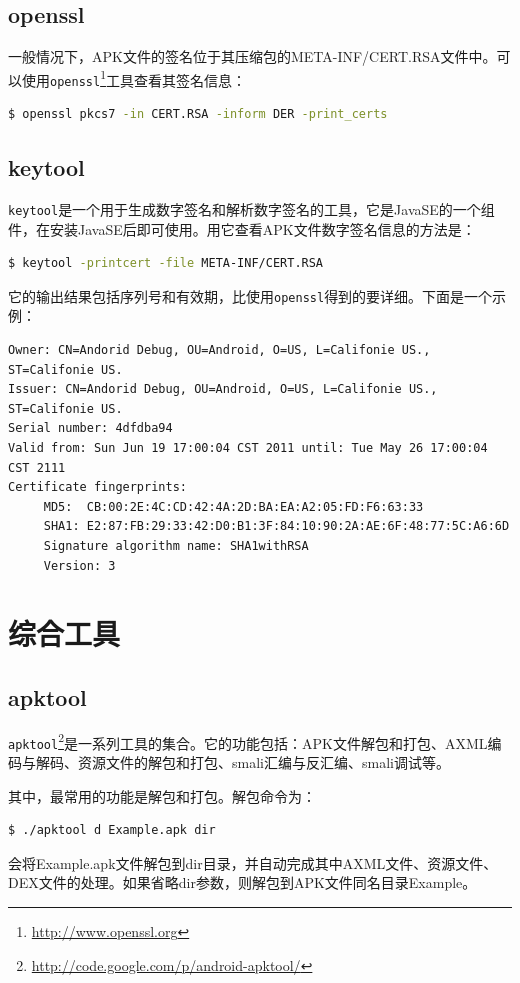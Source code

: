 \subsection{openssl}
一般情况下，APK文件的签名位于其压缩包的META-INF/CERT.RSA文件中。可以使用\lstinline!openssl!\footnote{\url{http://www.openssl.org}}工具查看其签名信息：
\begin{lstlisting}[language=bash, numbers=none]
 $ openssl pkcs7 -in CERT.RSA -inform DER -print_certs
\end{lstlisting}

\subsection{keytool}
\lstinline!keytool!是一个用于生成数字签名和解析数字签名的工具，它是JavaSE的一个组件，在安装JavaSE后即可使用。用它查看APK文件数字签名信息的方法是：
\begin{lstlisting}[language=bash, numbers=none]
 $ keytool -printcert -file META-INF/CERT.RSA
\end{lstlisting}
它的输出结果包括序列号和有效期，比使用\lstinline!openssl!得到的要详细。下面是一个示例：

\begin{lstlisting}[language={}, numbers=none]
Owner: CN=Andorid Debug, OU=Android, O=US, L=Califonie US., ST=Califonie US.
Issuer: CN=Andorid Debug, OU=Android, O=US, L=Califonie US., ST=Califonie US.
Serial number: 4dfdba94
Valid from: Sun Jun 19 17:00:04 CST 2011 until: Tue May 26 17:00:04 CST 2111
Certificate fingerprints:
	 MD5:  CB:00:2E:4C:CD:42:4A:2D:BA:EA:A2:05:FD:F6:63:33
	 SHA1: E2:87:FB:29:33:42:D0:B1:3F:84:10:90:2A:AE:6F:48:77:5C:A6:6D
	 Signature algorithm name: SHA1withRSA
	 Version: 3
\end{lstlisting}

\section{综合工具}
\subsection{apktool}
\lstinline!apktool!\footnote{\url{http://code.google.com/p/android-apktool/}}是一系列工具的集合。它的功能包括：APK文件解包和打包、AXML编码与解码、资源文件的解包和打包、smali汇编与反汇编、smali调试等。

其中，最常用的功能是解包和打包。解包命令为：
\begin{lstlisting}[language=bash, numbers=none]
 $ ./apktool d Example.apk dir
\end{lstlisting}
会将Example.apk文件解包到dir目录，并自动完成其中AXML文件、资源文件、DEX文件的处理。如果省略dir参数，则解包到APK文件同名目录Example。

